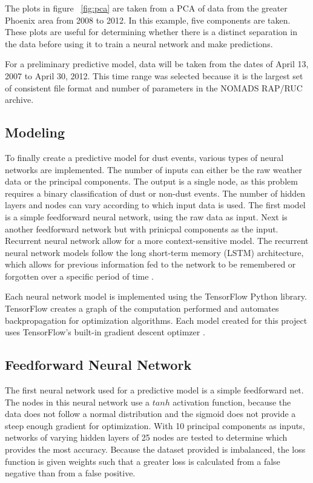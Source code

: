 \documentclass{article}
\begin{document}
The plots in figure ~\ref{fig:pca} are taken from a PCA of data from the greater Phoenix area from 2008 to 2012. In this example, five components are taken. These plots are useful for determining whether there is a distinct separation in the data before using it to train a neural network and make predictions. 

For a preliminary predictive model, data will be taken from the dates of April 13, 2007 to April 30, 2012. This time range was selected because it is the largest set of consistent file format and number of parameters in the NOMADS RAP/RUC archive. 

\subsection{Modeling}
To finally create a predictive model for dust events, various types of neural networks are implemented. The number of inputs can either be the raw weather data or the principal components. The output is a single node, as this problem requires a binary classification of dust or non-dust events. The number of hidden layers and nodes can vary according to which input data is used. The first model is a simple feedforward neural network, using the raw data as input. Next is another feedforward network but with prinicpal components as the input. Recurrent neural network allow for a more context-sensitive model. The recurrent neural network models follow the long short-term memory (LSTM) architecture, which allows for previous information fed to the network to be remembered or forgotten over a specific period of time \cite{rnn}.

Each neural network model is implemented using the TensorFlow Python library. TensorFlow creates a graph of the computation performed and automates backpropagation for optimization algorithms. Each model created for this project uses TensorFlow's built-in gradient descent optimzer \cite{tfdoc}.

\subsection{Feedforward Neural Network}
The first neural network used for a predictive model is a simple feedforward net. The nodes in this neural network use a $tanh$ activation function, because the data does not follow a normal distribution and the sigmoid does not provide a steep enough gradient for optimization. With 10 principal components as inputs, networks of varying hidden layers of 25 nodes are tested to determine which provides the most accuracy. Because the dataset provided is imbalanced, the loss function is given weights such that a greater loss is calculated from a false negative than from a false positive.
\end{document}
